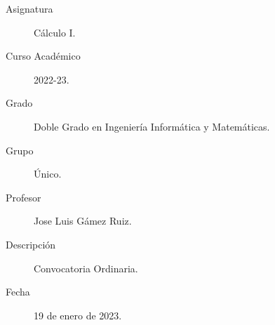 \documentclass[12pt]{article}
\begin{document}

    
    

    \begin{description}
        \item[Asignatura] Cálculo I.
        \item[Curso Académico] 2022-23.
        \item[Grado] Doble Grado en Ingeniería Informática y Matemáticas.
        \item[Grupo] Único.
        \item[Profesor] Jose Luis Gámez Ruiz.
        \item[Descripción] Convocatoria Ordinaria.
        \item[Fecha] 19 de enero de 2023.
    
    \end{description}
    \newpage
\end{document}
